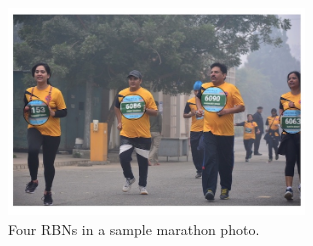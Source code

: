 \newpage
\begin{figure}[h!]
  \centering
  \includegraphics[width=0.7\textwidth]{images/introduction/rbn}
  \caption[Sample racing bib numbers]{Four RBNs in a sample marathon photo.}
  \label{fig:sample_rbns}
\end{figure}
\vspace{\fill}
